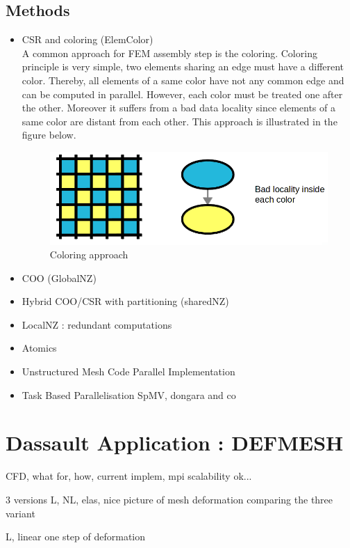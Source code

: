 \documentclass{IOS-Book-Article}
\begin{document}
\subsection{Methods}
\begin{itemize}
 \item CSR and coloring (ElemColor)\\
 A common approach for FEM assembly step is the coloring. Coloring principle is very simple, two elements sharing an edge must have a different color.
 Thereby, all elements of a same color have not any common edge and can be computed in parallel.
 However, each color must be treated one after the other. Moreover it suffers from a bad data locality since elements of a same color are distant from each other.
 This approach is illustrated in the figure below.
\begin{figure}[htp]
 \centering
 \label{fig1}
 \includegraphics[scale=0.25]{Coloring_approach.png}
 \caption{Coloring approach}
\end{figure}

 \item COO (GlobalNZ)
 \item Hybrid COO/CSR with partitioning (sharedNZ)
 \item LocalNZ : redundant computations
 \item Atomics
 \item Unstructured Mesh Code Parallel Implementation
 \item Task Based Parallelisation SpMV, dongara and co \cite{MPI_task}
\end{itemize}

\section{Dassault Application : DEFMESH}

CFD, what for, how, current implem, mpi scalability ok...

3 versions L, NL, elas, nice picture of mesh deformation comparing the three variant

L, linear one step of deformation
\end{document}

